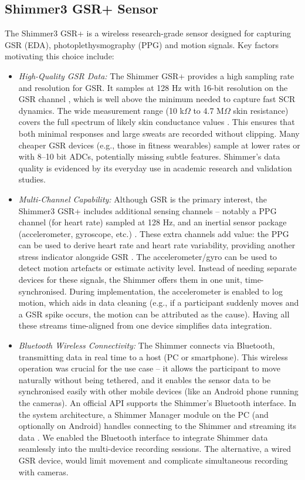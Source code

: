 \subsection{Shimmer3 GSR+ Sensor} The Shimmer3 GSR+ is a wireless research-grade sensor designed for capturing GSR (EDA), photoplethysmography (PPG) and motion signals. Key factors motivating this choice include:
\begin{itemize}
    \item \emph{High-Quality GSR Data:} The Shimmer GSR+ provides a high sampling rate and resolution for GSR. It samples at 128 Hz with 16-bit resolution on the GSR channel \cite{ref8}, which is well above the minimum needed to capture fast SCR dynamics. The wide measurement range (10 k$\Omega$ to 4.7 M$\Omega$ skin resistance) covers the full spectrum of likely skin conductance values \cite{ref8}. This ensures that both minimal responses and large sweats are recorded without clipping. Many cheaper GSR devices (e.g., those in fitness wearables) sample at lower rates or with 8--10 bit ADCs, potentially missing subtle features. Shimmer's data quality is evidenced by its everyday use in academic research and validation studies.
    \item \emph{Multi-Channel Capability:} Although GSR is the primary interest, the Shimmer3 GSR+ includes additional sensing channels -- notably a PPG channel (for heart rate) sampled at 128 Hz, and an inertial sensor package (accelerometer, gyroscope, etc.) \cite{ref15}. These extra channels add value: the PPG can be used to derive heart rate and heart rate variability, providing another stress indicator alongside GSR \cite{ref15}. The accelerometer/gyro can be used to detect motion artefacts or estimate activity level. Instead of needing separate devices for these signals, the Shimmer offers them in one unit, time-synchronised. During implementation, the accelerometer is enabled to log motion, which aids in data cleaning (e.g., if a participant suddenly moves and a GSR spike occurs, the motion can be attributed as the cause). Having all these streams time-aligned from one device simplifies data integration.
    \item \emph{Bluetooth Wireless Connectivity:} The Shimmer connects via Bluetooth, transmitting data in real time to a host (PC or smartphone). This wireless operation was crucial for the use case -- it allows the participant to move naturally without being tethered, and it enables the sensor data to be synchronised easily with other mobile devices (like an Android phone running the cameras). An official API supports the Shimmer's Bluetooth interface. In the system architecture, a Shimmer Manager module on the PC (and optionally on Android) handles connecting to the Shimmer and streaming its data \cite{ref15}. We enabled the Bluetooth interface to integrate Shimmer data seamlessly into the multi-device recording sessions. The alternative, a wired GSR device, would limit movement and complicate simultaneous recording with cameras.

\end{itemize}
